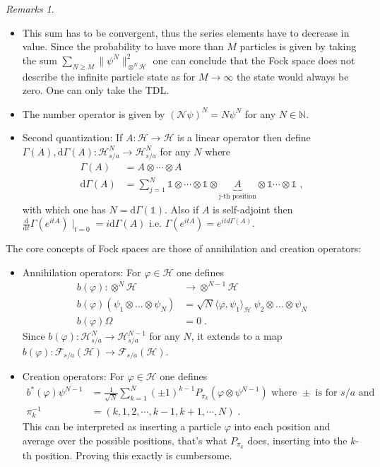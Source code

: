 \documentclass[
a4paper, %
11pt, %
onecolumn, %
openany, %
]{memoir}
\theoremstyle{definition}
\theoremstyle{remark}
\newtheorem{remarks}{Remarks}[chapter]
\theoremstyle{plain}
\begin{document}
\begin{remarks}
	\begin{itemize}
		\item This sum has to be convergent, thus the series elements have to decrease in value. Since the probability to have more than $M$ particles is given by taking the sum $\sum_{N\geq M}\|\psi^N\|^2_{\otimes^N\mathcal{H}}$ one can conclude that the Fock space does not describe the infinite particle state as for $M\rightarrow\infty$ the state would always be zero. One can only take the TDL.
		\item The number operator is given by $(\mathcal{N}\psi)^N=N\psi^N$ for any $N\in \mathbb{N}$.
		\item Second quantization: If $A:\mathcal{H}\rightarrow \mathcal{H}$ is a linear operator then define $\Gamma(A),\mathrm{d}\Gamma(A):\mathcal{H}_{s/a}^N\rightarrow \mathcal{H}_{s/a}^N$ for any $N$ where \begin{align}
		\Gamma(A)&=A\otimes \cdots \otimes A\\
		\mathrm{d}\Gamma(A)&=\sum_{j=1}^N\mathds{1}\otimes\cdots\otimes \mathds{1}\otimes \underbrace{A}_{\text{j-th position}}\otimes \mathds{1}\cdots \otimes \mathds{1}\;,
		\end{align}
		with which one has $N=\mathrm{d}\Gamma(\mathds{1})$. Also if $A$ is self-adjoint then $\frac{\mathrm{d}}{\mathrm{d}t}\Gamma(e^{itA})\mid_{t=0}=i\mathrm{d}\Gamma(A)$ i.e. $\Gamma(e^{itA})=e^{itd\Gamma(A)}$.
	\end{itemize}
\end{remarks}
The core concepts of Fock spaces are those of annihilation and creation operators: \begin{itemize}
	\item Annihilation operators: For $\varphi\in\mathcal{H}$ one defines \begin{align}
	b(\varphi):\otimes^N\mathcal{H}&\longrightarrow \otimes^{N-1}\mathcal{H}\\
	b(\varphi)(\psi_1\otimes\ldots\otimes\psi_N)&=\sqrt{N}\langle \varphi,\psi_1\rangle_{\mathcal{H}}~\psi_2\otimes\ldots\otimes\psi_N\\
	b(\varphi)\Omega &= 0\; .
	\end{align}
	Since $b(\varphi):\mathcal{H}_{s/a}^N\rightarrow \mathcal{H}_{s/a}^{N-1}$ for any $N$, it extends to a map $b(\varphi):\mathcal{F}_{s/a}(\mathcal{H})\rightarrow \mathcal{F}_{s/a}(\mathcal{H})$.
	\item Creation operators: For $\varphi\in\mathcal{H}$ one defines \begin{align}
	b^*(\varphi)\psi^{N-1}&=\frac{1}{\sqrt{N}}\sum_{k=1}^{N}(\pm 1)^{k-1}P_{\pi_k}(\varphi\otimes \psi^{N-1}) \text{ where $\pm$ is for $s/a$ and}\\
	\pi_k^{-1}&=(k,1,2,\cdots,k-1,k+1,\cdots,N)\; .
	\end{align}
	This can be interpreted as inserting a particle $\varphi$ into each position and average over the possible positions, that's what $P_{\pi_k}$ does, inserting into the $k$-th position. Proving this exactly is cumbersome.
	\end{itemize}
\end{document}

